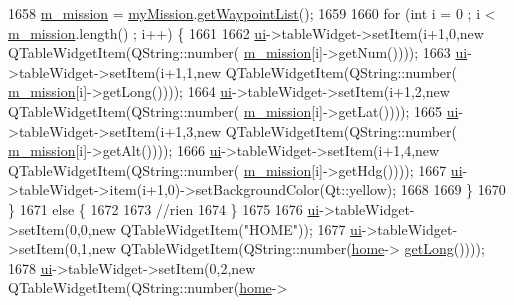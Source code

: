 \begin{DoxyCode}
1658         \hyperlink{a00008_abe44ff3e7525f2a803ac3cbce2fe7ba6}{m\_mission} = \hyperlink{a00008_a8bd377d858dd541faf8108389a13e5ed}{myMission}.\hyperlink{a00009_a4788e93bd0bed6d7fd53cff1840a7f5b}{getWaypointList}();
1659 
1660          \textcolor{keywordflow}{for} (\textcolor{keywordtype}{int} i = 0 ; i < \hyperlink{a00008_abe44ff3e7525f2a803ac3cbce2fe7ba6}{m\_mission}.length() ;  i++) \{
1661 
1662                \hyperlink{a00008_a6dc041ef6a2ffb329928d2913e8344e6}{ui}->tableWidget->setItem(i+1,0,\textcolor{keyword}{new} QTableWidgetItem(QString::number(
      \hyperlink{a00008_abe44ff3e7525f2a803ac3cbce2fe7ba6}{m\_mission}[i]->getNum())));
1663                \hyperlink{a00008_a6dc041ef6a2ffb329928d2913e8344e6}{ui}->tableWidget->setItem(i+1,1,\textcolor{keyword}{new} QTableWidgetItem(QString::number(
      \hyperlink{a00008_abe44ff3e7525f2a803ac3cbce2fe7ba6}{m\_mission}[i]->getLong())));
1664                \hyperlink{a00008_a6dc041ef6a2ffb329928d2913e8344e6}{ui}->tableWidget->setItem(i+1,2,\textcolor{keyword}{new} QTableWidgetItem(QString::number(
      \hyperlink{a00008_abe44ff3e7525f2a803ac3cbce2fe7ba6}{m\_mission}[i]->getLat())));
1665                \hyperlink{a00008_a6dc041ef6a2ffb329928d2913e8344e6}{ui}->tableWidget->setItem(i+1,3,\textcolor{keyword}{new} QTableWidgetItem(QString::number(
      \hyperlink{a00008_abe44ff3e7525f2a803ac3cbce2fe7ba6}{m\_mission}[i]->getAlt())));
1666                \hyperlink{a00008_a6dc041ef6a2ffb329928d2913e8344e6}{ui}->tableWidget->setItem(i+1,4,\textcolor{keyword}{new} QTableWidgetItem(QString::number(
      \hyperlink{a00008_abe44ff3e7525f2a803ac3cbce2fe7ba6}{m\_mission}[i]->getHdg())));
1667                \hyperlink{a00008_a6dc041ef6a2ffb329928d2913e8344e6}{ui}->tableWidget->item(i+1,0)->setBackgroundColor(Qt::yellow);
1668 
1669          \}
1670     \}
1671     \textcolor{keywordflow}{else} \{
1672 
1673         \textcolor{comment}{//rien}
1674     \}
1675 
1676     \hyperlink{a00008_a6dc041ef6a2ffb329928d2913e8344e6}{ui}->tableWidget->setItem(0,0,\textcolor{keyword}{new} QTableWidgetItem(\textcolor{stringliteral}{"HOME"}));
1677     \hyperlink{a00008_a6dc041ef6a2ffb329928d2913e8344e6}{ui}->tableWidget->setItem(0,1,\textcolor{keyword}{new} QTableWidgetItem(QString::number(\hyperlink{a00008_aff3d8bd7b2da805cc51487a7b3f7b6dd}{home}->
      \hyperlink{a00016_adbb7cce87647d82df57979083101d052}{getLong}())));
1678     \hyperlink{a00008_a6dc041ef6a2ffb329928d2913e8344e6}{ui}->tableWidget->setItem(0,2,\textcolor{keyword}{new} QTableWidgetItem(QString::number(\hyperlink{a00008_aff3d8bd7b2da805cc51487a7b3f7b6dd}{home}->

\end{DoxyCode}
